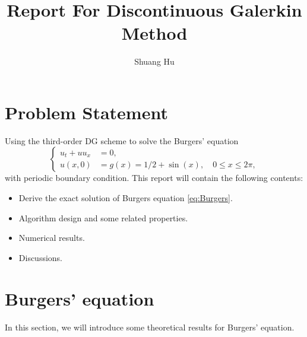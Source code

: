\documentclass[a4paper]{article}
\title{Report For Discontinuous Galerkin Method}
\author{Shuang Hu}
\affil{Zhejiang University}
\begin{document}
\maketitle
\section{Problem Statement}
Using the third-order DG scheme to solve the Burgers' equation 
\begin{equation}
    \left\{
    \label{eq:Burgers}
    \begin{aligned}
        u_{t}+uu_x&=0,\\
        u(x,0)&=g(x)=1/2+\sin(x),\quad 0\le x\le 2\pi,
    \end{aligned}
    \right.
\end{equation}
with periodic boundary condition. This report will contain the following contents:
\begin{itemize}
    \item Derive the exact solution of Burgers equation \eqref{eq:Burgers}.
    \item Algorithm design and some related properties.
    \item Numerical results.
    \item Discussions.
\end{itemize}
\section{Burgers' equation}

In this section, we will introduce some theoretical results for Burgers' equation. 
\end{document}
